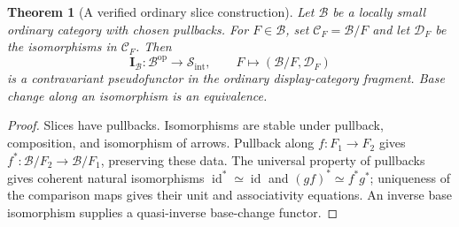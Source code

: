\documentclass[11pt]{article}
\theoremstyle{plain}
\newtheorem{theorem}{Theorem}[section]
\theoremstyle{definition}
\newcommand{\cS}{\mathcal{S}}
\newcommand{\cC}{\mathcal{C}}
\newcommand{\cD}{\mathcal{D}}
\newcommand{\Sint}{\cS_{\mathrm{int}}}
\newcommand{\II}{\mathbf{I}}
\DeclareMathOperator{\id}{id}
\begin{document}
\begin{theorem}[A verified ordinary slice construction]\label{thm:I-existence}
Let $\mathcal B$ be a locally small ordinary category with chosen pullbacks. For $F\in\mathcal B$, set $\cC_F=\mathcal B/F$ and let $\cD_F$ be the isomorphisms in $\cC_F$. Then
\[
 \II_{\mathcal B}:\mathcal B^{\mathrm{op}}\longrightarrow\Sint,
 \qquad F\longmapsto(\mathcal B/F,\cD_F)
\]
is a contravariant pseudofunctor in the ordinary display-category fragment. Base change along an isomorphism is an equivalence.
\end{theorem}
\begin{proof}
Slices have pullbacks. Isomorphisms are stable under pullback, composition, and isomorphism of arrows. Pullback along $f:F_1\to F_2$ gives $f^*:\mathcal B/F_2\to\mathcal B/F_1$, preserving these data. The universal property of pullbacks gives coherent natural isomorphisms $\id^*\simeq\id$ and $(gf)^*\simeq f^*g^*$; uniqueness of the comparison maps gives their unit and associativity equations. An inverse base isomorphism supplies a quasi-inverse base-change functor.
\end{proof}
\end{document}
